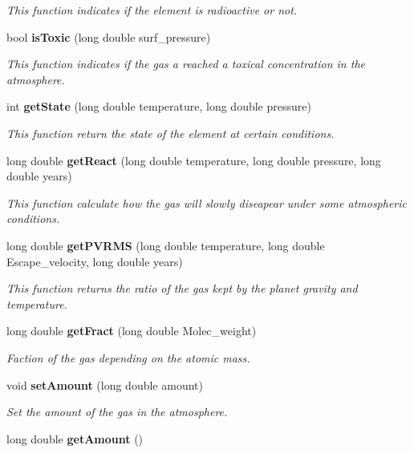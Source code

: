 \begin{CompactItemize}
\begin{CompactList}\small\item\em This function indicates if the element is radioactive or not. \item\end{CompactList}\item 
bool {\bf is\-Toxic} (long double surf\_\-pressure)\label{class_s_g___gas_a6}

\begin{CompactList}\small\item\em This function indicates if the gas a reached a toxical concentration in the atmosphere. \item\end{CompactList}\item 
int {\bf get\-State} (long double temperature, long double pressure)
\begin{CompactList}\small\item\em This function return the state of the element at certain conditions. \item\end{CompactList}\item 
long double {\bf get\-React} (long double temperature, long double pressure, long double years)
\begin{CompactList}\small\item\em This function calculate how the gas will slowly diseapear under some atmospheric conditions. \item\end{CompactList}\item 
long double {\bf get\-PVRMS} (long double temperature, long double Escape\_\-velocity, long double years)
\begin{CompactList}\small\item\em This function returns the ratio of the gas kept by the planet gravity and temperature. \item\end{CompactList}\item 
long double {\bf get\-Fract} (long double Molec\_\-weight)
\begin{CompactList}\small\item\em Faction of the gas depending on the atomic mass. \item\end{CompactList}\item 
void {\bf set\-Amount} (long double amount)\label{class_s_g___gas_a11}

\begin{CompactList}\small\item\em Set the amount of the gas in the atmosphere. \item\end{CompactList}\item 
long double {\bf get\-Amount} ()\label{class_s_g___gas_a12}


\end{CompactItemize}
